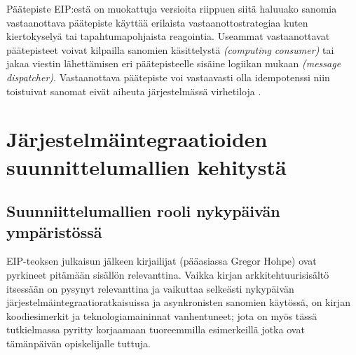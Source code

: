 \begin{itemize}
      Päätepiste EIP:estä on muokattuja versioita riippuen siitä haluuako sanomia vastaanottava päätepiste käyttää erilaista vastaanottostrategiaa kuten kiertokyselyä tai tapahtumapohjaista reagointia. Useammat vastaanottavat päätepisteet voivat kilpailla sanomien käsittelystä \textit{(computing consumer)} tai jakaa viestin lähettämisen eri päätepisteelle sisäine logiikan mukaan \textit{(message dispatcher)}. Vastaanottava päätepiste voi vastaavasti olla idempotenssi niin toistuivat sanomat eivät aiheuta järjestelmässä virhetiloja \citep[sivu~106]{Hohpe2004}.

\end{itemize}



\chapter{Järjestelmäintegraatioiden suunnittelumallien kehitystä}

\section{Suunniittelumallien rooli nykypäivän ympäristössä}
   EIP-teoksen \citep{Hohpe2004} julkaisun jälkeen kirjailijat (pääasiassa Gregor Hohpe) ovat pyrkineet pitämään sisällön relevanttina. Vaikka kirjan arkkitehtuurisisältö itsessään on pysynyt relevanttina ja vaikuttaa selkeästi nykypäivän järjestelmäintegraatioratkaisuissa ja asynkronisten sanomien käytössä, on kirjan koodiesimerkit ja teknologiamaininnat vanhentuneet; jota on myös tässä tutkielmassa pyritty korjaamaan tuoreemmilla esimerkeillä jotka ovat tämänpäivän opiskelijalle tuttuja. 


